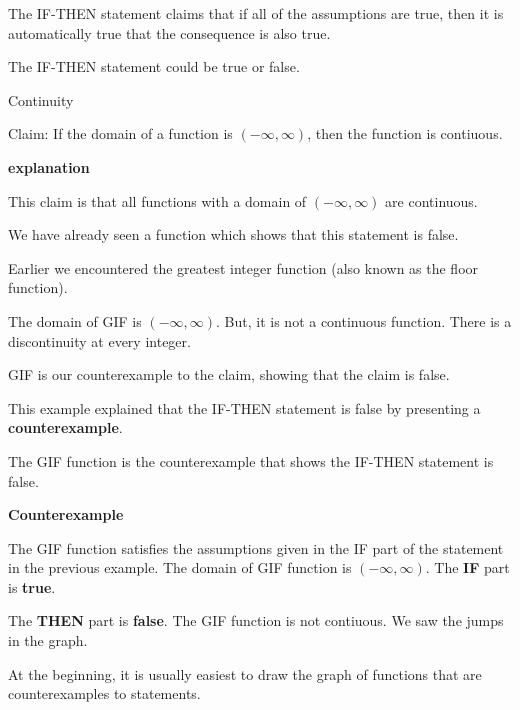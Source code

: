 \documentclass{ximera}
\begin{document}
The IF-THEN statement claims that if all of the assumptions are true, then it is automatically true that the consequence is also true.






The IF-THEN statement could be true or false.



\begin{example} Continuity


Claim: If the domain of a function is $(-\infty, \infty)$, then the function is contiuous.


\textbf{\textcolor{red!75!green}{explanation}} 


This claim is that all functions with a domain of $(-\infty, \infty)$ are continuous.


We have already seen a function which shows that this statement is false.



Earlier we encountered the greatest integer function (also known as the floor function).


The domain of GIF is $(-\infty, \infty)$.  But, it is not a continuous function.  There is a discontinuity at every integer.

GIF is our counterexample to the claim, showing that the claim is false.

\end{example}


This example explained that the IF-THEN statement is false by presenting a \textbf{counterexample}.


The GIF function is the counterexample that shows the IF-THEN statement is false.


\begin{explanation} \textbf{\textcolor{red!75!green}{Counterexample}}  


The GIF function satisfies the assumptions given in the IF part of the statement in the previous example. The domain of GIF function is $(-\infty, \infty)$.  The \textbf{\textcolor{purple!85!blue}{IF}} part is  \textbf{\textcolor{purple!85!blue}{true}}.

The \textbf{\textcolor{blue!75!black}{THEN}} part is  \textbf{\textcolor{blue!75!black}{false}}. The GIF function is not contiuous.  We saw the jumps in the graph.


\end{explanation}



At the beginning, it is usually easiest to draw the graph of functions that are counterexamples to statements.
\end{document}
